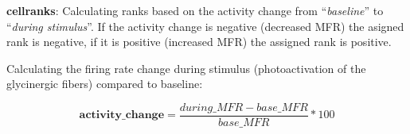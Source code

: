 \documentclass[12pt,]{article}
\newenvironment{Shaded}{\begin{snugshade}}{\end{snugshade}}
\newcommand{\DataTypeTok}[1]{\textcolor[rgb]{0.13,0.29,0.53}{#1}}
\newcommand{\DecValTok}[1]{\textcolor[rgb]{0.00,0.00,0.81}{#1}}
\newcommand{\KeywordTok}[1]{\textcolor[rgb]{0.13,0.29,0.53}{\textbf{#1}}}
\newcommand{\NormalTok}[1]{#1}
\newcommand{\OperatorTok}[1]{\textcolor[rgb]{0.81,0.36,0.00}{\textbf{#1}}}
\newcommand{\StringTok}[1]{\textcolor[rgb]{0.31,0.60,0.02}{#1}}
\begin{document}
\textbf{cellranks}: Calculating ranks based on the activity change from
``\emph{baseline}'' to ``\emph{during stimulus}''. If the activity
change is negative (decreased MFR) the asigned rank is negative, if it
is positive (increased MFR) the assigned rank is positive.

Calculating the firing rate change during stimulus (photoactivation of
the glycinergic fibers) compared to baseline:

\[\mathbf{activity\_change} = \frac{during\_MFR - base\_MFR}{base\_MFR} * 100\]

\begin{Shaded}
\end{Shaded}
\end{document}
